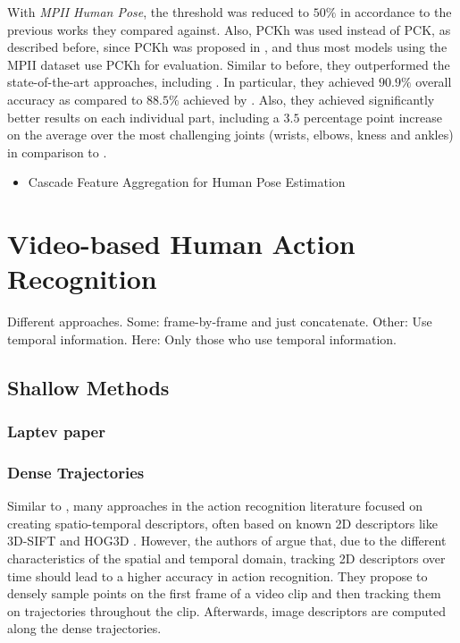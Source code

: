 With \textit{MPII Human Pose}, the threshold was reduced to $50\%$ in accordance to the previous works they compared against.
Also, PCKh was used instead of PCK, as described before, since PCKh was proposed in \cite{andriluka_2d_2014}, and thus most models using the MPII dataset use PCKh for evaluation.
Similar to before, they outperformed the state-of-the-art approaches, including \cite{wei_convolutional_2016}.
In particular, they achieved $90.9\%$ overall accuracy as compared to $88.5\%$ achieved by \cite{wei_convolutional_2016}.
Also, they achieved significantly better results on each individual part, including a $3.5$ percentage point increase on the average over the most challenging joints (wrists, elbows, kness and ankles) in comparison to \cite{wei_convolutional_2016}. 

\begin{itemize}
    \item Cascade Feature Aggregation for Human Pose Estimation \cite{su_cascade_2019}
\end{itemize}

\section{Video-based Human Action Recognition}

Different approaches.
Some: frame-by-frame and just concatenate.
Other: Use temporal information.
Here: Only those who use temporal information.

\subsection{Shallow Methods}
\subsubsection{Laptev paper}
\label{sec:laptev-shallow}


\subsubsection{Dense Trajectories}
\label{sec:dense-trajectories}

Similar to \cite{laptev_learning_2008}, many approaches in the action recognition literature focused on creating spatio-temporal descriptors, often based on known 2D descriptors like 3D-SIFT \cite{scovanner_3d_sift} and HOG3D \cite{klaser_hog3d}.
However, the authors of \cite{wang_dense_2013} argue that, due to the different characteristics of the spatial and temporal domain, tracking 2D descriptors over time should lead to a higher accuracy in action recognition.
They propose to densely sample points on the first frame of a video clip and then tracking them on trajectories throughout the clip.
Afterwards, image descriptors are computed along the dense trajectories.

